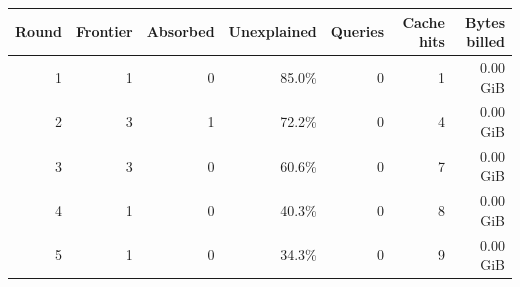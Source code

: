 \begin{tabular}{r r r r r r r}\toprule
\textbf{Round} & \textbf{Frontier} & \textbf{Absorbed} & \textbf{Unexplained} & \textbf{Queries} & \textbf{Cache hits} & \textbf{Bytes billed}\\\midrule
1 & 1 & 0 & 85.0\% & 0 & 1 & 0.00 GiB\\
2 & 3 & 1 & 72.2\% & 0 & 4 & 0.00 GiB\\
3 & 3 & 0 & 60.6\% & 0 & 7 & 0.00 GiB\\
4 & 1 & 0 & 40.3\% & 0 & 8 & 0.00 GiB\\
5 & 1 & 0 & 34.3\% & 0 & 9 & 0.00 GiB\\
\bottomrule\end{tabular}
